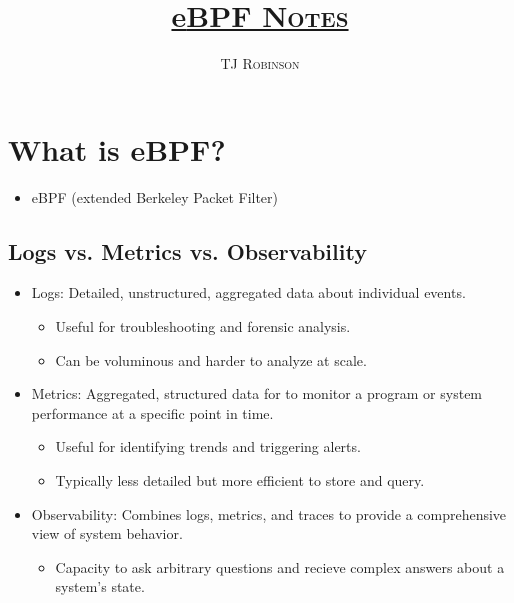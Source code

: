 \documentclass[a4paper,12pt]{article}
\begin{document}
\title{\underline{e\scshape{BPF Notes}}}
\author{\scshape{TJ Robinson}}
\maketitle

\section{What is eBPF?}
\begin{itemize}
    \item eBPF (extended Berkeley Packet Filter)
\end{itemize}

\subsection{Logs vs. Metrics vs. Observability}
\begin{itemize}
    \item Logs: Detailed, unstructured, aggregated data about individual events.
    \begin{itemize}
        \item  Useful for troubleshooting and forensic analysis.
        \item Can be voluminous and harder to analyze at scale.
    \end{itemize}
    \item Metrics: Aggregated, structured data for to monitor a program or system performance at a specific point in time.
    \begin{itemize}
        \item Useful for identifying trends and triggering alerts.
        \item Typically less detailed but more efficient to store and query.
    \end{itemize}
    \item Observability: Combines logs, metrics, and traces to provide a comprehensive view of system behavior.
    \begin{itemize}
        \item Capacity to ask arbitrary questions and recieve complex answers about a system's state.
    \end{itemize}
\end{itemize}
\end{document}
